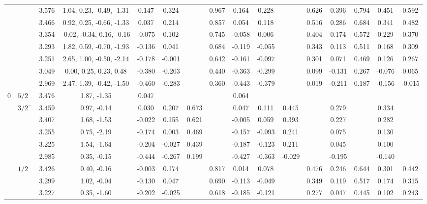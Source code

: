 \documentclass[prd,twocolumn,floatfix,nofootinbib]{revtex4}
\begin{document}
\begin{table*}[!htbp]
\begin{tabular}{cc|cc|cccccccccccc}
            &               &3.576  &1.04, 0.23, -0.49, -1.31 &0.147 &0.324 & &0.967 &0.164 &0.228 & &0.626 &0.396 &0.794 &0.451 &0.592 \\
            &               &3.466  &0.92, 0.25, -0.66, -1.33 &0.037 &0.214 & &0.857 &0.054 &0.118 & &0.516 &0.286 &0.684 &0.341 &0.482 \\
            &               &3.354  &-0.02, -0.34, 0.16, -0.16 &-0.075 &0.102 & &0.745 &-0.058 &0.006 & &0.404 &0.174 &0.572 &0.229 &0.370 \\
            &               &3.293  &1.82, 0.59, -0.70, -1.93 &-0.136 &0.041 & &0.684 &-0.119 &-0.055 & &0.343 &0.113 &0.511 &0.168 &0.309 \\
            &               &3.251  &2.65, 1.00, -0.50, -2.14 &-0.178 &-0.001 & &0.642 &-0.161 &-0.097 & &0.301 &0.071 &0.469 &0.126 &0.267 \\
            &               &3.049  &0.00, 0.25, 0.23, 0.48 &-0.380 &-0.203 & &0.440 &-0.363 &-0.299 & &0.099 &-0.131 &0.267 &-0.076 &0.065 \\
            &               &2.969  &2.47, 1.39, -0.42, -1.50 &-0.460 &-0.283 & &0.360 &-0.443 &-0.379 & &0.019 &-0.211 &0.187 &-0.156 &-0.015 \\
        0
            &${5/2}^{-}$    &3.476  &1.87, -1.35 &0.047 & & & &0.064 & & & & & & & \\
            &${3/2}^{-}$    &3.459  &0.97, -0.14 &0.030 &0.207 &0.673 & &0.047 &0.111 &0.445 & &0.279 & &0.334 & \\
            &               &3.407  &1.68, -1.53 &-0.022 &0.155 &0.621 & &-0.005 &0.059 &0.393 & &0.227 & &0.282 & \\
            &               &3.255  &0.75, -2.19 &-0.174 &0.003 &0.469 & &-0.157 &-0.093 &0.241 & &0.075 & &0.130 & \\
            &               &3.225  &1.54, -1.64 &-0.204 &-0.027 &0.439 & &-0.187 &-0.123 &0.211 & &0.045 & &0.100 & \\
            &               &2.985  &0.35, -0.15 &-0.444 &-0.267 &0.199 & &-0.427 &-0.363 &-0.029 & &-0.195 & &-0.140 & \\
            &${1/2}^{-}$    &3.426  &0.40, -0.16 &-0.003 &0.174 & &0.817 &0.014 &0.078 & &0.476 &0.246 &0.644 &0.301 &0.442 \\
            &               &3.299  &1.02, -0.04 &-0.130 &0.047 & &0.690 &-0.113 &-0.049 & &0.349 &0.119 &0.517 &0.174 &0.315 \\
            &               &3.227  &0.35, -1.60 &-0.202 &-0.025 & &0.618 &-0.185 &-0.121 & &0.277 &0.047 &0.445 &0.102 &0.243 \\

\end{tabular}
\end{table*}
\end{document}
